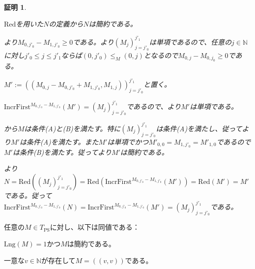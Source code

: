 \documentclass[dvipdfmx,uplatex]{jsarticle}
\theoremstyle{customnonumberbreakfortheorem}
\theoremstyle{customnonumberbreakforproof}
\newtheorem{hideableproof}{証明}
\begin{document}
\begin{hideableproof}
	\begin{indented}
		\item \(\textrm{Red}\)を用いた\(N\)の定義から\(N\)は簡約である。
		\item {}より\(M_{0,j'_0}-M_{1,j'_0} \geq 0\)である。より\((M_j)_{j=j'_0}^{j'_1}\)は単項であるので、任意の\(j \in \mathbb{N}\)に対し\(j'_0 \leq j \leq j'_1\)ならば\((0,j'_0) \leq_M (0,j)\)となるので\(M_{0,j}-M_{0,j_0} \geq 0\)である。
		\item \(M' := ((M_{0,j}-M_{0,j'_0}+M_{1,j'_0},M_{1,j}))_{j=j'_0}^{j'_1}\)と置く。
		\item \(\textrm{IncrFirst}^{M_{0,j'_0} - M_{1,j'_0}}(M') = (M_j)_{j=j'_0}^{j'_1}\)であるので、より\(M'\)は単項である。
		\item {}から\(M\)は条件(A)と(B)を満たす。特に\((M_j)_{j=j'_0}^{j'_1}\)は条件(A)を満たし、従ってより\(M'\)は条件(A)を満たす。また\(M'\)は単項でかつ\(M'_{0,0} = M_{1,j'_0} = M'_{1,0}\)であるので\(M'\)は条件(B)を満たす。従ってより\(M'\)は簡約である。
		\item {}より\(N = \textrm{Red}((M_j)_{j=j'_0}^{j'_1}) = \textrm{Red}(\textrm{IncrFirst}^{M_{0,j'_0} - M_{1,j'_0}}(M')) = \textrm{Red}(M') = M'\)である。従って\(\textrm{IncrFirst}^{M_{0,j'_0} - M_{1,j'_0}}(N) = \textrm{IncrFirst}^{M_{0,j'_0} - M_{1,j'_0}}(M') = (M_j)_{j=j'_0}^{j'_1}\)である。
	\end{indented}
\end{hideableproof}

\begin{corollary}[\(1\)列ペア数列の基本性質]\label{1列ペア数列の基本性質}
	任意の\(M \in T_{\textrm{PS}}\)に対し、以下は同値である：
	\begin{penumerate}
		\item \(\textrm{Lng}(M) = 1\)かつ\(M\)は簡約である。
		\item 一意な\(v \in \mathbb{N}\)が存在して\(M = ((v,v))\)である。
	\end{penumerate}
\end{corollary}
\end{document}
